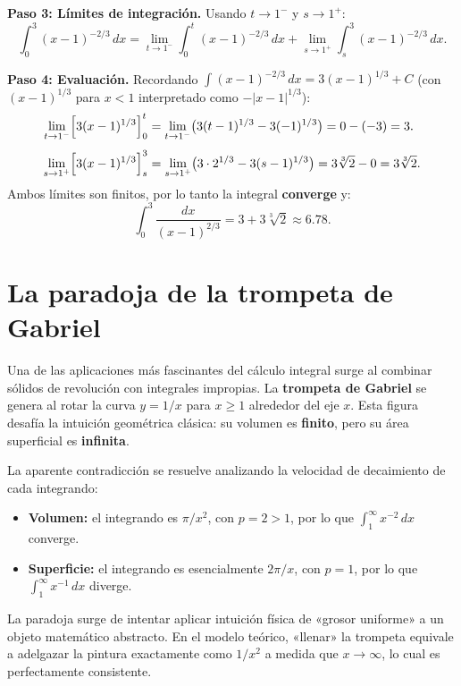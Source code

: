 \begin{example}
\begin{myproof}
\textbf{Paso 3: Límites de integración.}
Usando $t\to 1^-$ y $s\to 1^+$:
\[
  \int_0^3(x-1)^{-2/3}\,dx
  = \lim_{t\to 1^-}\int_0^t(x-1)^{-2/3}\,dx
  + \lim_{s\to 1^+}\int_s^3(x-1)^{-2/3}\,dx.
\]

\textbf{Paso 4: Evaluación.}
Recordando $\int(x-1)^{-2/3}\,dx = 3(x-1)^{1/3}+C$ (con $(x-1)^{1/3}$ para $x<1$ interpretado
como $-|x-1|^{1/3}$):
\begin{align*}
\lim_{t\to 1^-}\Bigl[3(x-1)^{1/3}\Bigr]_0^t
  &= \lim_{t\to 1^-}\bigl(3(t-1)^{1/3} - 3(-1)^{1/3}\bigr)
   = 0 - (-3) = 3. \\[4pt]
\lim_{s\to 1^+}\Bigl[3(x-1)^{1/3}\Bigr]_s^3
  &= \lim_{s\to 1^+}\bigl(3\cdot 2^{1/3} - 3(s-1)^{1/3}\bigr)
   = 3\sqrt[3]{2} - 0 = 3\sqrt[3]{2}.
\end{align*}
Ambos límites son finitos, por lo tanto la integral \textbf{converge} y:
\[
  \boxed{\int_0^3\frac{dx}{(x-1)^{2/3}} = 3 + 3\sqrt[3]{2} \approx 6.78.}
\]
\end{myproof}
\end{example}

\section{La paradoja de la trompeta de Gabriel}

Una de las aplicaciones más fascinantes del cálculo integral surge al combinar sólidos de revolución
con integrales impropias. La \textbf{trompeta de Gabriel} se genera al rotar la curva $y=1/x$ para
$x\geq 1$ alrededor del eje $x$. Esta figura desafía la intuición geométrica clásica: su volumen es
\textbf{finito}, pero su área superficial es \textbf{infinita}.

\begin{rem}
La aparente contradicción se resuelve analizando la velocidad de decaimiento de cada integrando:
\begin{itemize}
    \item \textbf{Volumen:} el integrando es $\pi/x^2$, con $p=2>1$, por lo que
          $\int_1^\infty x^{-2}\,dx$ converge.
    \item \textbf{Superficie:} el integrando es esencialmente $2\pi/x$, con $p=1$, por lo que
          $\int_1^\infty x^{-1}\,dx$ diverge.
\end{itemize}
La paradoja surge de intentar aplicar intuición física de «grosor uniforme» a un objeto matemático
abstracto. En el modelo teórico, «llenar» la trompeta equivale a adelgazar la pintura exactamente
como $1/x^2$ a medida que $x\to\infty$, lo cual es perfectamente consistente.
\end{rem}

